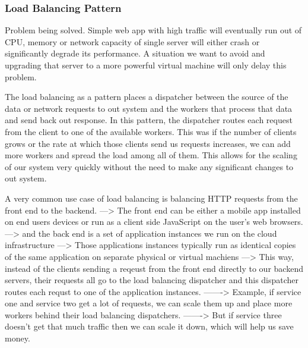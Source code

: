 \documentclass[a4paper, 11pt]{book}
\begin{document}
{    \subsubsection{Load Balancing Pattern}
    Problem being solved.
    Simple web app with high traffic will eventually run out of CPU, memory or network capacity of single server will either crash or significantly degrade its performance.
    A situation we want to avoid and upgrading that server to a more powerful virtual machine will only delay this problem.

    The load balancing as a pattern places a dispatcher between the source of the data or network requests to out system and the workers that process that data and send back out response.
    In this pattern, the dispatcher routes each request from the client to one of the available workers.
    This was if the number of clients grows or the rate at which those clients send us requests increases, we can add more workers and spread the load among all of them.
    This allows for the scaling of our system very quickly without the need to make any significant changes to out system.

    A very common use case of load balancing is balancing HTTP requests from the front end to the backend.
    ---> The front end can be either a mobile app installed on end users devices or run as a client side JavaScript on the user's web browsers.
    ---> and the back end is a set of application instances we run on the cloud infrastructure
    ---> Those applications instances typically run as identical copies of the same application on separate physical or virtual machiens
    ---> This way, instead of the clients sending a reqeust from the front end directly to our backend servers, their requests all go to the load balancing dispatcher and this dispatcher routes each requst to one of the application instances.
    -------> Example, if service one and service two get a lot of requests, we can scale them up and place more workers behind their load balancing dispatchers.
    -------> But if service three doesn't get that much traffic then we can scale it down, which will help us save money.

}
\end{document}
